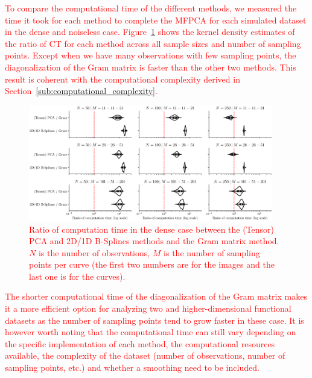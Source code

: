 \begin{results}
\textcolor{red}{To compare the computational time of the different methods, we measured the time it took for each method to complete the MFPCA for each simulated dataset in the dense and noiseless case. Figure~\ref{fig:computation_time_mfd_1d} shows the kernel density estimates of the ratio of CT for each method across all sample sizes and number of sampling points. Except when we have many observations with few sampling points, the diagonalization of the Gram matrix is faster than the other two methods. This result is coherent with the computational complexity derived in Section~\ref{sub:computational_complexity}.}

\begin{figure}
     \centering
    \includegraphics[width=0.95\textwidth]{figures/computation_time.eps}
    \caption{\textcolor{red}{Ratio of computation time in the dense case between the (Tensor) PCA and 2D/1D B-Splines methods and the Gram matrix method. $N$ is the number of observations, $M$ is the number of sampling points per curve (the first two numbers are for the images and the last one is for the curves).}}
    \label{fig:computation_time_mfd_1d}
\end{figure}

\textcolor{red}{The shorter computational time of the diagonalization of the Gram matrix makes it a more efficient option for analyzing two and higher-dimensional functional datasets as the number of sampling points tend to grow faster in these case. It is however worth noting that the computational time can still vary depending on the specific implementation of each method, the computational resources available, the complexity of the dataset (number of observations, number of sampling points, etc.) and whether a smoothing need to be included.}
\end{results}

